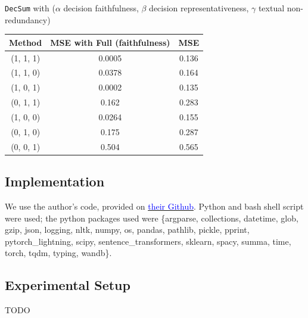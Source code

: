 \documentclass{article}
\newcommand{\blue}[1]{\textcolor{blue}{#1}}
\begin{document}
\begin{center}
\texttt{DecSum} with ($\alpha$ decision faithfulness, $\beta$ decision representativeness, $\gamma$ textual non-redundancy)
\begin{tabular}{|c|c|c|}
    \hline
    \textbf{Method} & \textbf{MSE with Full (faithfulness)} & \textbf{MSE} \\
    \hline
    (1, 1, 1) & 0.0005 & 0.136 \\
    \hline
    (1, 1, 0) & 0.0378 & 0.164 \\
    \hline
    (1, 0, 1) & 0.0002 & 0.135 \\
    \hline
    (0, 1, 1) & 0.162  & 0.283 \\
    \hline
    (1, 0, 0) & 0.0264 & 0.155 \\
    \hline
    (0, 1, 0) & 0.175  & 0.287 \\
    \hline
    (0, 0, 1) & 0.504  & 0.565 \\
    \hline
\end{tabular}
\end{center}

\subsection{Implementation}
We use the author’s code, provided on \href{https://github.com/ChicagoHAI/decsum}{\blue{their Github}}. Python and bash shell script were used; the python packages used were
\{argparse, collections, datetime, glob, gzip, json, logging, nltk, numpy, os, pandas, pathlib, pickle, pprint, pytorch\_lightning, scipy, sentence\_transformers, sklearn, spacy, summa, time, torch,
tqdm, typing, wandb\}.

\subsection{Experimental Setup}
TODO
\end{document}
